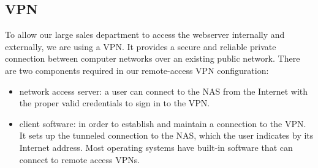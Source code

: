 \subsection{VPN}
To allow our large sales department to access the webserver internally and
externally, we are using a VPN. It provides a secure and reliable private 
connection between computer networks over an existing public network.
There are two components required in our remote-access VPN configuration:
\begin{itemize}
	\item network access server: a user can connect to the NAS from the
		Internet with the proper valid credentials to sign in to the
		VPN.
	\item client software: in order to establish and maintain a connection
		to the VPN. It sets up the tunneled connection to the NAS,
		which the user indicates by its Internet address. Most
		operating systems have built-in software that can connect to
		remote access VPNs.
\end{itemize}
